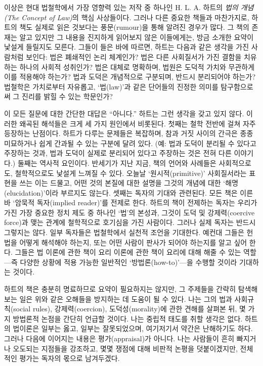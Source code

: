 \documentclass[12pt, oneside]{book}  %
\begin{document}
이상은 현대 법철학에서 가장 영향력 있는 저작 중 하나인 H. L. A. 하트의
\emph{법의 개념(The Concept of Law)}의 핵심 사상들이다. 그러나 다른
중요한 책들과 마찬가지로, 하트의 책도 실제로 읽은 것보다는
풍문(rumour)을 통해 알려진 경우가 많다. 그 책의 존재는 알고 있지만 그
내용을 진지하게 읽어보지 않은 이들에게는, 방금 소개한 요약이 낯설게
들릴지도 모른다. 그들이 들은 바에 따르면, 하트는 다음과 같은 생각을 가진
사람처럼 보인다: 법은 폐쇄적인 논리 체계인가? 법은 다른 사회질서가 가진
결함을 치유하는 하나의 사회적 성취인가? 법은 대체로 명확하며, 법원은
도덕적 가치와 무관하게 이를 적용해야 하는가? 법과 도덕은 개념적으로
구분되며, 반드시 분리되어야 하는가? 법철학은 가치로부터 자유롭고,
`법(law)'과 같은 단어들의 진정한 의미를 탐구함으로써 그 진리를 밝힐 수
있는 학문인가?

이 모든 질문에 대한 간단한 대답은 ``아니다.'' 하트는 그런 생각을 갖고
있지 않다. 이러한 왜곡된 해석들은 크게 세 가지 원인에서 비롯된다. 첫째는
철학 전반에 걸쳐 자주 등장하는 난점이다. 하트가 다루는 문제들은
복잡하며, 참과 거짓 사이의 간극은 종종 미묘하거나 쉽게 간과될 수 있는
구분에 달려 있다. (예: 법과 도덕이 분리될 수 있다고 주장하는 것과, 법과
도덕이 실제로 분리되어 있다고 주장하는 것은 전혀 다른 이야기다.) 둘째는
역사적 요인이다. 반세기가 지난 지금, 책의 언어와 사례들은 사회적으로도,
철학적으로도 낯설게 느껴질 수 있다. 오늘날 `원시적(primitive)'
사회질서라는 표현을 쓰는 이는 드물고, 어떤 것의 본질에 대한 설명을
그것의 개념에 대한 `해명(elucidation)'이라 부르지도 않는다. 셋째는
독자의 기대와 관련된다. 모든 책은 이른바 `암묵적 독자(implied reader)'를
전제로 한다. 하트의 책이 전제하는 독자는 우리가 가진 가장 중요한 정치
제도 중 하나인 `법'의 본성과, 그것이 도덕 및 강제력(coercive force)과
맺는 관계에 철학적으로 호기심을 가진 사람이다. 그러나 실제 독자는 반드시
그렇지는 않다. 일부 독자들은 법철학에서 실천적 조언을 기대한다. 예컨대
그들은 헌법을 어떻게 해석해야 하는지, 또는 어떤 사람이 판사가 되어야
하는지를 알고 싶어 한다. 그들은 법 이론에 관한 책이 요리 이론에 관한
책이 요리에 대해 해줄 수 있는 역할---즉 다양한 상황에 적용 가능한
일반적인 `방법론(how-to)'---을 수행할 것이라 기대하는 것이다.

하트의 책은 충분히 명료하므로 요약이 필요하지는 않지만, 그 주제들을
간략히 탐색해보는 일은 위와 같은 오해들을 방지하는 데 도움이 될 수 있다.
나는 그의 법과 사회규칙(social rules), 강제력(coercion),
도덕성(morality)에 관한 견해를 살펴본 뒤, 몇 가지 방법론적 논점을 간단히
언급할 것이다. 나는 중립적 태도를 취할 생각은 없다. 하트의 법이론은
일부는 옳고, 일부는 잘못되었으며, 여기저기서 약간은 난해하기도 하다.
그러나 다음에 이어지는 내용은 평가(appraisal)가 아니다. 나는 사람들이
흔히 빠지거나 오도되는 지점들을 강조하고, 몇몇 쟁점에 대해 비판적 논평을
덧붙이겠지만, 전체적인 평가는 독자의 몫으로 남겨두겠다.
\end{document}

